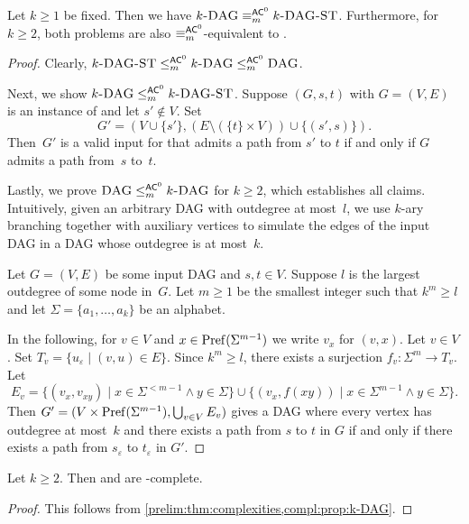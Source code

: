\begin{proposition}
	\label{compl:prop:k-DAG}
	Let $k \ge 1$ be fixed. 
	Then we have $\text{\sc $k$-DAG} \equiv_m^{\textup{\textsf{AC}}^0} \text{\sc $k$-DAG-ST}$.
	Furthermore, for $k\ge 2$, both problems are also $\equiv_m^{\textup{\textsf{AC}}^0}$-equivalent to \DAG.
\end{proposition}
\begin{proof}
	Clearly, $\text{\sc $k$-DAG-ST} \le_m^{\textup{\textsf{AC}}^0} \text{\sc $k$-DAG} \le_m^{\textup{\textsf{AC}}^0} \text{\sc DAG}$.	
	
	Next, we show $\text{\sc $k$-DAG} \le_m^{\textup{\textsf{AC}}^0} \text{\sc $k$-DAG-ST}$. Suppose $(G, s, t)$ with $G = (V, E)$ is an instance of \KDAG
	and let $s' \notin V$.
	Set 
	\[
	G' = (V \cup \{s'\}, ( E \setminus ( \{t\} \times V ) ) \cup \{ (s', s)\} ).
	\]
	Then~$G'$ is a valid input for \KDAGST
	that admits a path from $s'$ to $t$ if and only if $G$ admits a path from~$s$ to~$t$.
	
	Lastly, we prove $\text{\sc DAG} \le_m^{\textup{\textsf{AC}}^0} \text{\sc $k$-DAG}$ for $k \ge 2$, which establishes all claims.
	Intuitively, given an arbitrary DAG with outdegree at most~$l$,
	we use $k$-ary branching together with auxiliary vertices
	to simulate the edges of the input DAG
	in a DAG whose outdegree is at most~$k$.	
		
	Let $G = (V, E)$ be some input DAG and $s,t \in V$.
	Suppose $l$ is the largest outdegree of some node in~$G$.
	Let $m \ge 1$ be the smallest integer such that $k^m \ge l$
	and let $\Sigma = \{a_1, \ldots, a_k\}$ be an alphabet.	
	
	In the following, for $v \in V$
	and $x \in \operatorname{Pref}(\Sigma^{m-1})$
	we write $v_x$ for $(v,x)$.
	Let $v \in V$. Set $T_v = \{ u_{\varepsilon} \mid (v, u) \in E\}$.
	Since $k^m \ge l$, there exists a surjection
	$f_v \colon \Sigma^m \to T_v$.
	Let
	\[
	E_v = \{ (v_x, v_{xy}) \mid x \in \Sigma^{< m - 1} \land y \in \Sigma \} \cup 
	\{ (v_x, f(xy)) \mid x \in \Sigma^{m-1} \land y \in \Sigma \}.
	\]
	Then $G' = (V \times \operatorname{Pref}(\Sigma^{m-1}), \bigcup_{v \in V} E_v)$
	gives a DAG where every vertex has outdegree at most~$k$
	and there exists a path from $s$ to $t$ in $G$
	if and only if there exists a path from $s_{\varepsilon}$
	to $t_{\varepsilon}$ in $G'$. 
\end{proof}

\begin{corollary}	\label{compl:cor:k-DAG}
	Let $k \ge 2$. Then \KDAG
	and \KDAGST 
	are \NL-complete.
\end{corollary}
\begin{proof}
	This follows from \cref{prelim:thm:complexities,compl:prop:k-DAG}.
\end{proof}

